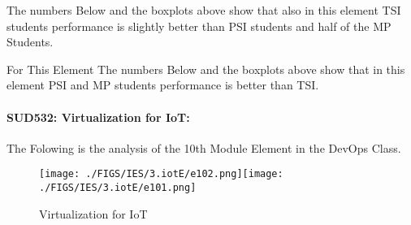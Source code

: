\documentclass[12pt]{extreport}
\begin{document}

The numbers Below and the boxplots above show that also in this element  TSI students performance is slightly better than PSI students and half of the MP Students.

For This Element The numbers Below and the boxplots above show that in this element  PSI and MP students performance is  better than TSI.


\begin{comment}


\begin{enumerate}	
	\item The MP Class Box-Plot:
	\begin{enumerate}
		\item MAX = a {} {} {} {} {} {} {} {} UQ = b {} {} {} {} {} {} {} {} Median = c
		\item LQ = d {} {} {} {} {} {} {} {}  MIN =	l {} {} {} {} {} {} {} {}  IQR = e - f = g
	\end{enumerate}
	\item The PSI Class Box-Plot:
	\begin{enumerate}
		\item MAX = a {} {} {} {} {} {} {} {} UQ = b {} {} {} {} {} {} {} {} Median = c
		\item LQ = d {} {} {} {} {} {} {} {}  MIN =	e {} {} {} {} {} {} {} {} IQR = f - g = h	
	\end{enumerate}
	\item The TSI Class Box-Plot:
	\begin{enumerate}
		\item MAX = a {} {} {} {} {} {} {} {} UQ = b {} {} {} {} {} {} {} {} Median = c
		\item LQ = d {} {} {} {} {} {} {} {} MIN = e {} {} {} {} {} {} {} {} IQR = f - g = h	
	\end{enumerate}
\end{enumerate}

\end{comment}







\paragraph{\large SUD532: Virtualization for IoT:\\
} 
The Folowing is the analysis of the 10th Module Element in the DevOps Class.
\begin{figure}[H]
	\centering
	\texttt{[image: ./FIGS/IES/3.iotE/e102.png]}\texttt{[image: ./FIGS/IES/3.iotE/e101.png]}
	\caption{Virtualization for IoT}
	\label{fig:39}
\end{figure}
\end{document}
